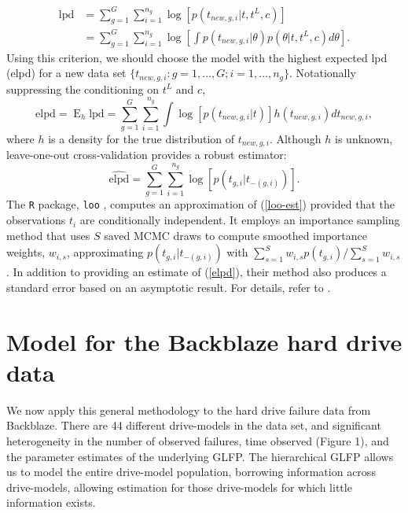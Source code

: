 \documentclass[12pt]{article}
\newcommand{\op}{\operatorname}
\begin{document}
\begin{align*}
\mbox{lpd} &= \sum_{g=1}^G \sum_{i=1}^{n_g} \log[p(t_{new,g,i}|t, t^L, c)] \\
&= \sum_{g=1}^G \sum_{i=1}^{n_g} \log \left[ \int p(t_{new,g, i}|\theta) p(\theta|t,t^L,c) d\theta \right].
\end{align*}
\noindent Using this criterion, we should choose the model with the highest expected lpd (elpd) for a new data set $\{t_{new,g,i}:g=1,\ldots,G; i=1,\ldots,n_g\}$. Notationally suppressing the conditioning on $t^L$ and $c$,
\begin{equation}
\mbox{elpd} = \op{E}_h \mbox{lpd} = \sum_{g=1}^G \sum_{i=1}^{n_g} \int \log [p(t_{new, g, i}|t)] h(t_{new,g,i}) d t_{new,g,i},
\label{elpd}
\end{equation}
where $h$ is a density for the true distribution of $t_{new,g,i}$. Although $h$ is unknown, leave-one-out cross-validation provides a robust estimator:
\begin{equation}
\widehat{\text{elpd}} = \sum_{g=1}^G \sum_{i=1}^{n_g} \log [p(t_{g,i}|t_{-(g,i)})].
\label{loo-est}
\end{equation}
The \texttt{R} package, \texttt{loo} \citep{loo}, computes an approximation of (\ref{loo-est}) provided that the observations $t_i$ are conditionally independent. It employs an importance sampling method that uses $S$ saved MCMC draws to compute smoothed importance weights, $w_{i,s}$, approximating $p(t_{g,i}|t_{-(g,i)})$ with $\sum_{s=1}^S w_{i,s} p(t_{g,i})/\sum_{s=1}^S w_{i,s}$. In addition to providing an estimate of (\ref{elpd}), their method also produces a standard error based on an asymptotic result. For details, refer to \cite{vehtari}.

\section{Model for the Backblaze hard drive data}
\label{sec:Data analysis}
We now apply this general methodology to the hard drive failure data from Backblaze.  There are 44 different drive-models in the data set, and significant heterogeneity in the number of observed failures, time observed (Figure 1), and the parameter estimates of the underlying GLFP. The hierarchical GLFP allows us to model the entire drive-model population, borrowing information across drive-models, allowing estimation for those drive-models for which little information exists. 
\end{document}
